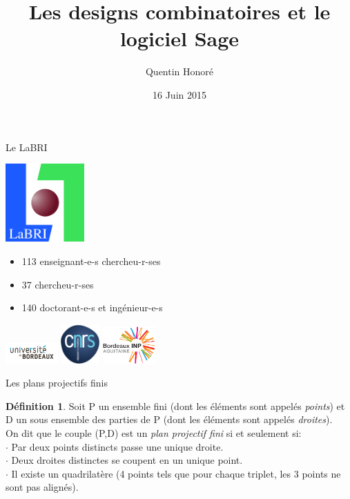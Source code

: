 \documentclass[10pt]{beamer}
\title{Les designs combinatoires et le logiciel Sage}
\author{Quentin Honoré}
\institute{LaBRI}
\date{16 Juin 2015}
\theoremstyle{definition}
\newtheorem{Def}{Définition}[section]
\begin{document}
\begin{frame}
  \titlepage
\end{frame}


\begin{frame}
    {\Huge Le LaBRI}
  \begin{minipage}{0.3\linewidth}
    \includegraphics[height=3cm]{labri.jpg}
  \end{minipage}
  \begin{minipage}{0.65\linewidth}
    \begin{itemize}
    \item 113 enseignant-e-s chercheu-r-ses
    \item 37 chercheu-r-ses
      \item 140 doctorant-e-s et ingénieur-e-s
    \end{itemize}
    
    \includegraphics[width=2cm]{univbdx.jpg}\;
    \includegraphics[height=1.5cm]{cnrs.png}\;
    \includegraphics[width=2cm]{inp.PNG}
    \end{minipage}
\end{frame}


\begin{frame}
{\Huge Les plans projectifs finis}
\begin{Def}
Soit P un ensemble fini (dont les éléments sont appelés \emph{points}) et D un sous ensemble des parties de P (dont les éléments sont appelés \emph{droites}).\medskip \\
On dit que le couple (P,D) est un \emph{plan projectif fini} si et seulement si: \\
$\cdot$ Par deux points distincts passe une unique droite. \\
$\cdot$ Deux droites distinctes se coupent en un unique point. \\
$\cdot$ Il existe un quadrilatère (4 points tels que pour chaque triplet, les 3 points ne sont pas alignés).
\end{Def}
\end{frame}
\end{document}
